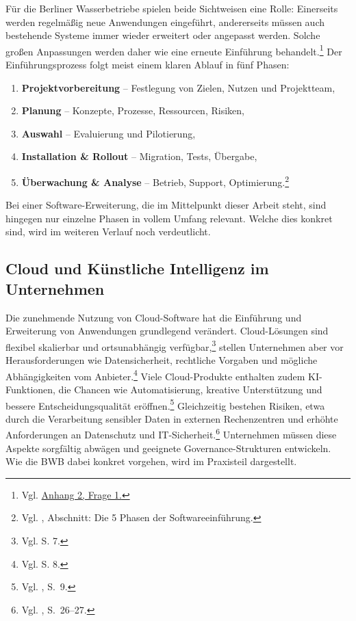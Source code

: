 \documentclass[
    12pt, 
    a4paper,
    ]{scrartcl} %
\begin{document}
Für die Berliner Wasserbetriebe spielen beide Sichtweisen eine Rolle: Einerseits werden regelmäßig neue Anwendungen eingeführt, andererseits müssen auch bestehende Systeme immer wieder erweitert oder angepasst werden. Solche großen Anpassungen werden daher wie eine erneute Einführung behandelt.\footnote{Vgl. \hyperref[sec:Anhang2]{Anhang 2, Frage 1.}}
Der Einführungsprozess folgt meist einem klaren Ablauf in fünf Phasen:  
\begin{enumerate}
    \item \textbf{Projektvorbereitung} – Festlegung von Zielen, Nutzen und Projektteam,
    \item \textbf{Planung} – Konzepte, Prozesse, Ressourcen, Risiken,
    \item \textbf{Auswahl} – Evaluierung und Pilotierung,
    \item \textbf{Installation \& Rollout} – Migration, Tests, Übergabe,
    \item \textbf{Überwachung \& Analyse} – Betrieb, Support, Optimierung.\footnote{Vgl. \cite{papershift2022}, Abschnitt: Die 5 Phasen der Softwareeinführung.}
\end{enumerate}
Bei einer Software-Erweiterung, die im Mittelpunkt dieser Arbeit steht, sind hingegen nur einzelne Phasen in vollem Umfang relevant. Welche dies konkret sind, wird im weiteren Verlauf noch verdeutlicht.
\subsection{Cloud und Künstliche Intelligenz im Unternehmen}

Die zunehmende Nutzung von Cloud-Software hat die Einführung und Erweiterung von Anwendungen grundlegend verändert. Cloud-Lösungen sind flexibel skalierbar und ortsunabhängig verfügbar,\footnote{Vgl. \cite{BSI_2024} S. 7.} stellen Unternehmen aber vor Herausforderungen wie Datensicherheit, rechtliche Vorgaben und mögliche Abhängigkeiten vom Anbieter.\footnote{Vgl. \cite{BSI_2024} S. 8.} 
Viele Cloud-Produkte enthalten zudem KI-Funktionen, die Chancen wie Automatisierung, kreative Unterstützung und bessere Entscheidungsqualität eröffnen.\footnote{Vgl. \cite{S_BSI_KI}, S.~9.} Gleichzeitig bestehen Risiken, etwa durch die Verarbeitung sensibler Daten in externen Rechenzentren und erhöhte Anforderungen an Datenschutz und IT-Sicherheit.\footnote{Vgl. \cite{S_ENISA_AI}, S.~26--27.} 
Unternehmen müssen diese Aspekte sorgfältig abwägen und geeignete Governance-Strukturen entwickeln. Wie die BWB dabei konkret vorgehen, wird im Praxisteil dargestellt.
\end{document}
